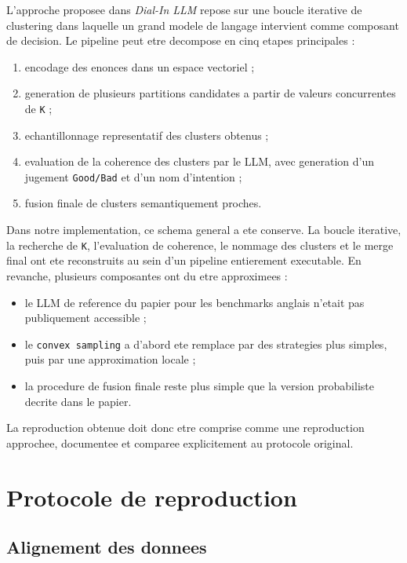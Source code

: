 L'approche proposee dans \emph{Dial-In LLM} repose sur une boucle iterative de
clustering dans laquelle un grand modele de langage intervient comme composant
de decision. Le pipeline peut etre decompose en cinq etapes principales :
\begin{enumerate}[leftmargin=*]
  \item encodage des enonces dans un espace vectoriel ;
  \item generation de plusieurs partitions candidates a partir de valeurs
  concurrentes de \texttt{K} ;
  \item echantillonnage representatif des clusters obtenus ;
  \item evaluation de la coherence des clusters par le LLM, avec generation
  d'un jugement \texttt{Good/Bad} et d'un nom d'intention ;
  \item fusion finale de clusters semantiquement proches.
\end{enumerate}

Dans notre implementation, ce schema general a ete conserve. La boucle
iterative, la recherche de \texttt{K}, l'evaluation de coherence, le nommage
des clusters et le merge final ont ete reconstruits au sein d'un pipeline
entierement executable. En revanche, plusieurs composantes ont du etre
approximees :
\begin{itemize}[leftmargin=*]
  \item le LLM de reference du papier pour les benchmarks anglais n'etait pas
  publiquement accessible ;
  \item le \texttt{convex sampling} a d'abord ete remplace par des strategies
  plus simples, puis par une approximation locale ;
  \item la procedure de fusion finale reste plus simple que la version
  probabiliste decrite dans le papier.
\end{itemize}

La reproduction obtenue doit donc etre comprise comme une reproduction
approchee, documentee et comparee explicitement au protocole original.

\section{Protocole de reproduction}

\subsection{Alignement des donnees}

